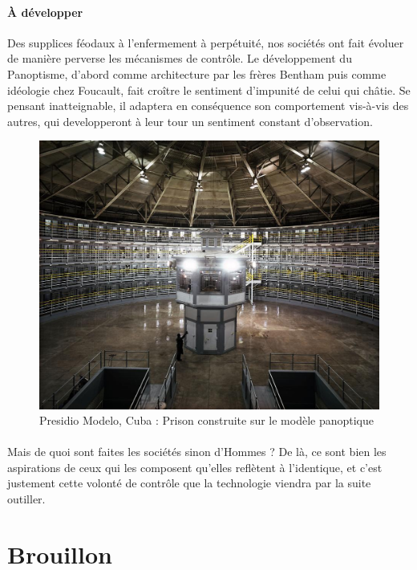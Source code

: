 \paragraph{À développer} Des supplices féodaux à l'enfermement à perpétuité, nos sociétés ont fait évoluer de manière perverse les
mécanismes de contrôle. Le développement du Panoptisme, d'abord comme architecture par les frères Bentham puis 
comme idéologie chez Foucault, fait croître le sentiment d'impunité de celui qui châtie. Se pensant inatteignable, il 
adaptera en conséquence son comportement vis-à-vis des autres, qui developperont à leur tour un sentiment constant
d'observation.

\begin{figure}[h]
    \centering
    \includegraphics[scale=0.2]{images/panoptique.jpg}
    \caption{\label{Panoptique} Presidio Modelo, Cuba : Prison construite sur le modèle panoptique}
\end{figure}

\paragraph{} Mais de quoi sont faites les sociétés sinon d'Hommes ? De là, ce sont bien les aspirations de ceux qui les 
composent qu'elles reflètent à l'identique, et c'est justement cette volonté de contrôle que la technologie viendra par
la suite outiller.

\section*{Brouillon}

